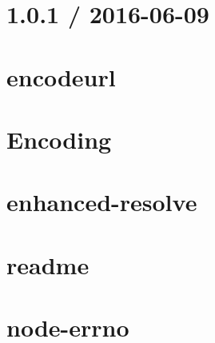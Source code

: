 \documentclass[twoside]{book}
\newcommand{\+}{\discretionary{\mbox{\scriptsize$\hookleftarrow$}}{}{}}
\begin{document}
\chapter{1.0.1 / 2016-\/06-\/09}
\label{md__c_1_workspace_demo_src_main_script_node_modules_encodeurl__h_i_s_t_o_r_y}

\chapter{encodeurl}
\label{md__c_1_workspace_demo_src_main_script_node_modules_encodeurl__r_e_a_d_m_e}

\chapter{Encoding}
\label{md__c_1_workspace_demo_src_main_script_node_modules_encoding__r_e_a_d_m_e}

\chapter{enhanced-\/resolve}
\label{md__c_1_workspace_demo_src_main_script_node_modules_enhanced-resolve__r_e_a_d_m_e}

\chapter{readme}
\label{md__c_1_workspace_demo_src_main_script_node_modules_entities_readme}

\chapter{node-\/errno}
\label{md__c_1_workspace_demo_src_main_script_node_modules_errno__r_e_a_d_m_e}

\end{document}
